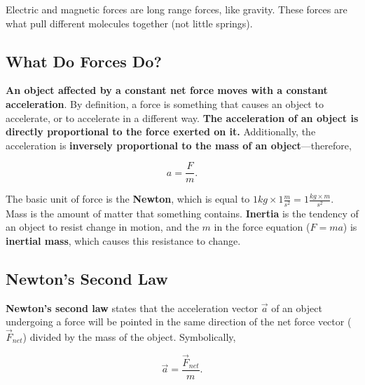 \documentclass[12pt,letterpaper]{article}
\begin{document}
Electric and magnetic forces are long range forces, like gravity. These forces are what pull different molecules together (not little springs).

\subsection[What Do Forces Do?]{What Do Forces Do?}

\textbf{An object affected by a constant net force moves with a constant acceleration}. By definition, a force is something that causes an object to accelerate, or to accelerate in a different way. \textbf{The acceleration of an object is directly proportional to the force exerted on it.} Additionally, the acceleration is \textbf{inversely proportional to the mass of an object}---therefore,

\begin{center}
	$$a = \frac{F}{m}.$$\linebreak
\end{center}

The basic unit of force is the \textbf{Newton}, which is equal to $1 kg \times 1 \frac{m}{s^{2}} = 1 \frac{kg \times m}{s^{2}}$. \\

Mass is the amount of matter that something contains. \textbf{Inertia} is the tendency of an object to resist change in motion, and the $m$ in the force equation ($F = ma$) is \textbf{inertial mass}, which causes this resistance to change.

\subsection[Newton's Second Law]{Newton's Second Law}

\textbf{Newton's second law} states that the acceleration vector $\vec{a}$ of an object undergoing a force will be pointed in the same direction of the net force vector ($\vec{F}_{net}$) divided by the mass of the object. Symbolically,

\begin{center}
	$$\vec{a} = \frac{\vec{F}_{net}}{m}.$$\linebreak
\end{center}
\end{document}
